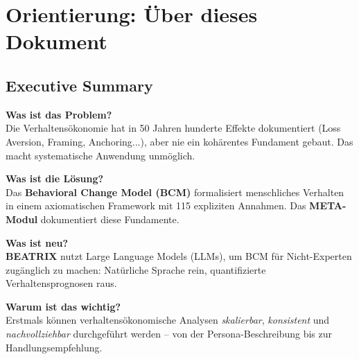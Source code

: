 
\section*{Orientierung: Über dieses Dokument}

\subsection*{Executive Summary}

\begin{tcolorbox}[colback=blue!5!white, colframe=blue!75!black, title=Das Wichtigste in 60 Sekunden]

\textbf{Was ist das Problem?}\\
Die Verhaltensökonomie hat in 50 Jahren hunderte Effekte dokumentiert (Loss Aversion, Framing, Anchoring...), aber nie ein kohärentes Fundament gebaut. Das macht systematische Anwendung unmöglich.

\textbf{Was ist die Lösung?}\\
Das \textbf{Behavioral Change Model (BCM)} formalisiert menschliches Verhalten in einem axiomatischen Framework mit 115 expliziten Annahmen. Das \textbf{META-Modul} dokumentiert diese Fundamente.

\textbf{Was ist neu?}\\
\textbf{BEATRIX} nutzt Large Language Models (LLMs), um BCM für Nicht-Experten zugänglich zu machen: Natürliche Sprache rein, quantifizierte Verhaltensprognosen raus.

\textbf{Warum ist das wichtig?}\\
Erstmals können verhaltensökonomische Analysen \textit{skalierbar}, \textit{konsistent} und \textit{nachvollziehbar} durchgeführt werden -- von der Persona-Beschreibung bis zur Handlungsempfehlung.

\end{tcolorbox}

